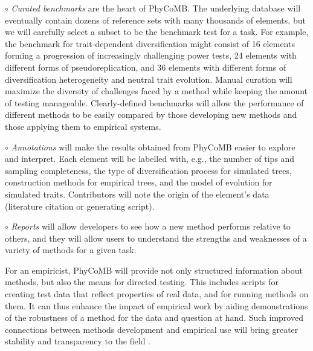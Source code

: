 $\circ$ \textit{Curated benchmarks} are the heart of PhyCoMB.
The underlying database will eventually contain dozens of reference sets with many thousands of elements, but we will carefully select a subset to be the benchmark test for a task.
For example, the benchmark for trait-dependent diversification might consist of 16 elements forming a progression of increasingly challenging power tests, 24 elements with different forms of pseudoreplication, and 36 elements with different forms of diversification heterogeneity and neutral trait evolution.
Manual curation will maximize the diversity of challenges faced by a method while keeping the amount of testing manageable.
Clearly-defined benchmarks will allow the performance of different methods to be easily compared by those developing new methods and those applying them to empirical systems.

$\circ$ \textit{Annotations} will make the results obtained from PhyCoMB easier to explore and interpret.
Each element will be labelled with, e.g., the number of tips and sampling completeness, 
the type of diversification process for simulated trees,
construction methods for empirical trees,
and the model of evolution for simulated traits. 
Contributors will note the origin of the element's data (literature citation or generating script). %


$\circ$ \textit{Reports} will allow developers to see how a new method performs relative to others, and they will allow users to understand the strengths and weaknesses of a variety of methods for a given task.

For an empiricist, PhyCoMB will provide not only structured information about methods, but also the means for directed testing.
This includes scripts for creating test data that reflect properties of real data, and for running methods on them.
It can thus enhance the impact of empirical work by aiding demonstrations of the robustness of a method for the data and question at hand.
Such improved connections between methods development and empirical use will bring greater stability and transparency to the field \citep{cooper2016}.

